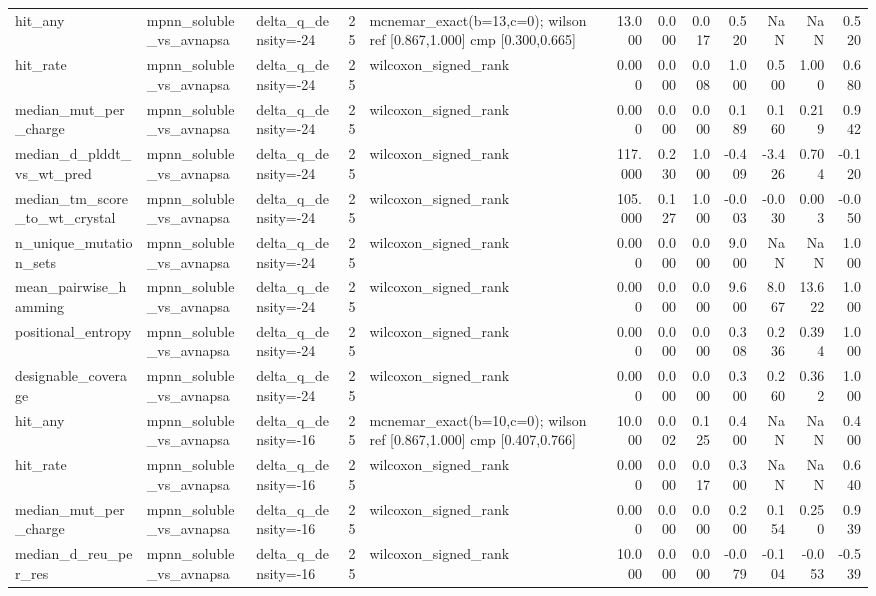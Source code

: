 \begin{table}
{\begin{tabular}{lllrlrrrrrrr}
hit\_any & mpnn\_soluble\_vs\_avnapsa & delta\_q\_density=-24 & 25 & mcnemar\_exact(b=13,c=0); wilson ref [0.867,1.000] cmp [0.300,0.665] & 13.000 & 0.000 & 0.017 & 0.520 & NaN & NaN & 0.520 \\
hit\_rate & mpnn\_soluble\_vs\_avnapsa & delta\_q\_density=-24 & 25 & wilcoxon\_signed\_rank & 0.000 & 0.000 & 0.008 & 1.000 & 0.500 & 1.000 & 0.680 \\
median\_mut\_per\_charge & mpnn\_soluble\_vs\_avnapsa & delta\_q\_density=-24 & 25 & wilcoxon\_signed\_rank & 0.000 & 0.000 & 0.000 & 0.189 & 0.160 & 0.219 & 0.942 \\
median\_d\_plddt\_vs\_wt\_pred & mpnn\_soluble\_vs\_avnapsa & delta\_q\_density=-24 & 25 & wilcoxon\_signed\_rank & 117.000 & 0.230 & 1.000 & -0.409 & -3.426 & 0.704 & -0.120 \\
median\_tm\_score\_to\_wt\_crystal & mpnn\_soluble\_vs\_avnapsa & delta\_q\_density=-24 & 25 & wilcoxon\_signed\_rank & 105.000 & 0.127 & 1.000 & -0.003 & -0.030 & 0.003 & -0.050 \\
n\_unique\_mutation\_sets & mpnn\_soluble\_vs\_avnapsa & delta\_q\_density=-24 & 25 & wilcoxon\_signed\_rank & 0.000 & 0.000 & 0.000 & 9.000 & NaN & NaN & 1.000 \\
mean\_pairwise\_hamming & mpnn\_soluble\_vs\_avnapsa & delta\_q\_density=-24 & 25 & wilcoxon\_signed\_rank & 0.000 & 0.000 & 0.000 & 9.600 & 8.067 & 13.622 & 1.000 \\
positional\_entropy & mpnn\_soluble\_vs\_avnapsa & delta\_q\_density=-24 & 25 & wilcoxon\_signed\_rank & 0.000 & 0.000 & 0.000 & 0.308 & 0.236 & 0.394 & 1.000 \\
designable\_coverage & mpnn\_soluble\_vs\_avnapsa & delta\_q\_density=-24 & 25 & wilcoxon\_signed\_rank & 0.000 & 0.000 & 0.000 & 0.300 & 0.260 & 0.362 & 1.000 \\
hit\_any & mpnn\_soluble\_vs\_avnapsa & delta\_q\_density=-16 & 25 & mcnemar\_exact(b=10,c=0); wilson ref [0.867,1.000] cmp [0.407,0.766] & 10.000 & 0.002 & 0.125 & 0.400 & NaN & NaN & 0.400 \\
hit\_rate & mpnn\_soluble\_vs\_avnapsa & delta\_q\_density=-16 & 25 & wilcoxon\_signed\_rank & 0.000 & 0.000 & 0.017 & 0.300 & NaN & NaN & 0.640 \\
median\_mut\_per\_charge & mpnn\_soluble\_vs\_avnapsa & delta\_q\_density=-16 & 25 & wilcoxon\_signed\_rank & 0.000 & 0.000 & 0.000 & 0.200 & 0.154 & 0.250 & 0.939 \\
median\_d\_reu\_per\_res & mpnn\_soluble\_vs\_avnapsa & delta\_q\_density=-16 & 25 & wilcoxon\_signed\_rank & 10.000 & 0.000 & 0.000 & -0.079 & -0.104 & -0.053 & -0.539 \\

\end{tabular}}
\end{table}
